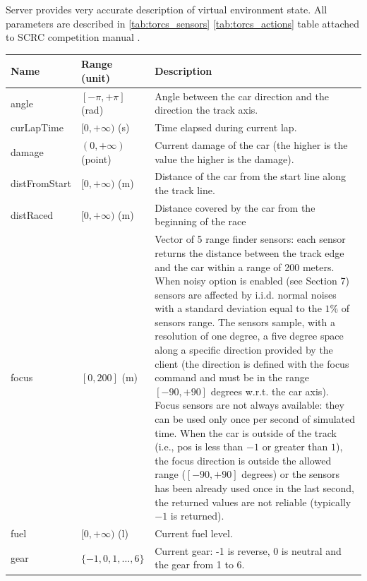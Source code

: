 \documentclass[declaration,shortabstract,english,inz]{iithesis}
\begin{document}
Server provides very accurate description of virtual environment state. All parameters are described in \ref{tab:torcs_sensors} \ref{tab:torcs_actions} table attached to SCRC competition manual \cite{scrc_manual}. 

\begin{center}
    \begin{longtable}{ | p{} |p{}| p{} |}
     \hline
     \textbf{Name} & \textbf{Range (unit)} & \textbf{Description} \\ 
     \hline
     angle & $[-\pi, +\pi]$ (rad) & Angle between the car direction and the direction the track axis. \\  
     \hline
     curLapTime & $[0, +\infty)$ (s) & Time elapsed during current lap. \\
     \hline
     damage & $(0, +\infty)$ (point) & Current damage of the car (the higher is the value the higher is the damage). \\
     \hline
     distFromStart & $[0, +\infty)$ (m) & Distance of the car from the start line along the track line. \\
     \hline
     distRaced & $[0, +\infty)$ (m) & Distance covered by the car from the beginning of the race \\
     \hline
     focus & $[0, 200]$ (m) & Vector of 5 range finder sensors: each sensor returns the distance between the track edge and the car within a range of 200 meters. When noisy option is enabled (see Section 7) sensors are affected by i.i.d. normal noises with a standard deviation equal to the $1\%$ of sensors range. The sensors sample, with a resolution of one degree, a five degree space along a specific direction provided by the client (the direction is defined with the focus command and must be in the range $[-90,+90]$ degrees w.r.t. the car axis). Focus sensors are not always available: they can be used only once per second of simulated time. When the car is outside of the track (i.e., pos is less than $-1$ or greater than $1$), the focus direction is outside the allowed range ($[-90,+90]$ degrees) or the sensors has been already used once in the last second, the returned values are not reliable (typically $-1$ is returned). \\
     \hline
     fuel & $[0, +\infty)$ (l) & Current fuel level. \\
     \hline
     gear & $ \{ -1,0,1, \dots, 6 \} $ & Current gear: -1 is reverse, 0 is neutral and the gear from 1 to 6. \\
     \hline

\end{longtable}
\end{center}
\end{document}
